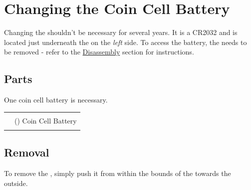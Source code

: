 \chapter{Changing the Coin Cell Battery} \label{Changing Battery}

Changing the \hyperref[Coin Cell Battery]{} shouldn't be necessary for
several years.  It is a \num{CR2032} and is located just underneath the 
on the \textit{left} side.  To access the battery, the  needs to be
removed - refer to the \hyperref[Disassembly]{Disassembly} section for
instructions.

\section{Parts}

One  coin cell battery is necessary.

\begin{table}[H]
\centering
\begin{tabu} { X[1,r,m] | X[6,l,m] }
  \thrule
   &  \\  &  () Coin Cell Battery \\
  \bhrule
\end{tabu}
\end{table}

\section{Removal}

To remove the , simply push it from within the bounds of the 
towards the outside.

